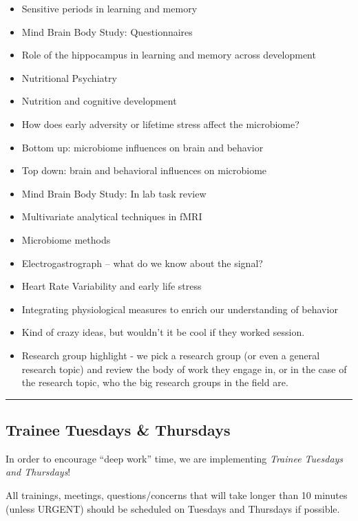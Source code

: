 \documentclass[]{book}
\providecommand{\tightlist}{%
  \setlength{\itemsep}{0pt}\setlength{\parskip}{0pt}}
\begin{document}
\begin{itemize}
\tightlist
\item
  Sensitive periods in learning and memory
\item
  Mind Brain Body Study: Questionnaires
\item
  Role of the hippocampus in learning and memory across development
\item
  Nutritional Psychiatry
\item
  Nutrition and cognitive development
\item
  How does early adversity or lifetime stress affect the microbiome?
\item
  Bottom up: microbiome influences on brain and behavior
\item
  Top down: brain and behavioral influences on microbiome
\item
  Mind Brain Body Study: In lab task review
\item
  Multivariate analytical techniques in fMRI
\item
  Microbiome methods
\item
  Electrogastrograph -- what do we know about the signal?
\item
  Heart Rate Variability and early life stress
\item
  Integrating physiological measures to enrich our understanding of behavior
\item
  Kind of crazy ideas, but wouldn't it be cool if they worked session.
\item
  Research group highlight - we pick a research group (or even a general research topic) and review the body of work they engage in, or in the case of the research topic, who the big research groups in the field are.
\end{itemize}

\begin{center}\rule{0.5\linewidth}{\linethickness}\end{center}

\hypertarget{trainee-tuesdays-thursdays}{%
\subsection{Trainee Tuesdays \& Thursdays}\label{trainee-tuesdays-thursdays}}

In order to encourage ``deep work'' time, we are implementing \emph{Trainee Tuesdays and Thursdays}!

All trainings, meetings, questions/concerns that will take longer than 10 minutes (unless URGENT) should be scheduled on Tuesdays and Thursdays if possible.
\end{document}
